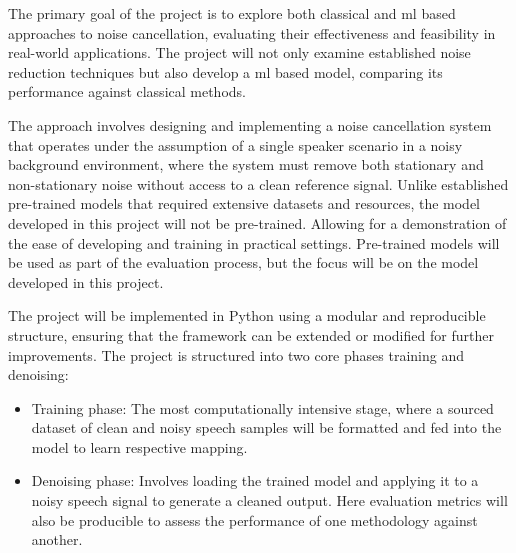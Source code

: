 The primary goal of the project is to explore both classical and \gls{ml} based approaches to noise cancellation, evaluating their effectiveness and feasibility in real-world applications. The project will not only examine established noise reduction techniques but also develop a \gls{ml} based model, comparing its performance against classical methods.

The approach involves designing and implementing a noise cancellation system that operates under the assumption of a single speaker scenario in a noisy background environment, where the system must remove both stationary and non-stationary noise without access to a clean reference signal. Unlike established pre-trained models that required extensive datasets and resources, the model developed in this project will not be pre-trained. Allowing for a demonstration of the ease of developing and training in practical settings. Pre-trained models will be used as part of the evaluation process, but the focus will be on the model developed in this project.

The project will be implemented in Python using a modular and reproducible structure, ensuring that the framework can be extended or modified for further improvements. The project is structured into two core phases training and denoising:

\begin{itemize}
    \item Training phase: The most computationally intensive stage, where a sourced dataset of clean and noisy speech samples will be formatted and fed into the model to learn respective mapping.
    \item Denoising phase: Involves loading the trained model and applying it to a noisy speech signal to generate a cleaned output. Here evaluation metrics will also be producible to assess the performance of one methodology against another.
\end{itemize}
